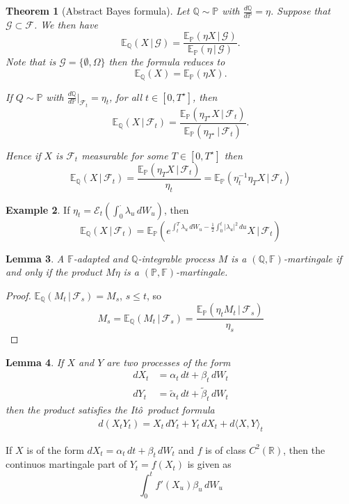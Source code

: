 \documentclass[10pt, oneside, reqno]{amsbook}
\theoremstyle{plain}%
\newtheorem{thm}{Theorem}[chapter]
\newtheorem{lem}[thm]{Lemma}
\theoremstyle{definition}
\newtheorem{exmp}[thm]{Example}
\theoremstyle{remark}
\newcommand{\given}{ \, | \,}
\newcommand{\sigf}{\mathcal{F}}
\newcommand{\Q}{\mathbb{Q}}
\newcommand{\R}{\mathbb{R}}
\newcommand{\E}{\mathbb{E}}
\renewcommand{\P}{\mathbb{P}}
\newcommand{\F}{\mathbb{F}}
\newcommand{\sigg}{\mathcal{G}}
\newcommand{\ito}{It\^o\ }
\newcommand{\doleans}[1]{\mathcal E_t \left(\int_0^\cdot #1 \right)}
\numberwithin{equation}{chapter}
\begin{document}
\begin{thm}[Abstract Bayes formula]
	Let $\Q \sim \P$ with $\frac{d \Q}{d \P} = \eta$.  Suppose that $\sigg \subset \sigf$.  We then have \[
		\E_\Q(X \given \sigg) = \frac{\E_\P(\eta X \given \sigg)}{\E_\P(\eta \given \sigg)}.
	\]  Note that is $\sigg = \{ \emptyset, \Omega \}$ then the formula reduces to \[
		\E_\Q(X) = \E_\P(\eta X).
	\]

	If $Q \sim \P$ with $\frac{d\Q}{d\P} |_{\sigf_t} = \eta_t$, for all $t \in [0, T^\star]$, then \[
		\E_\Q(X \given \sigf_t) = \frac{\E_\P(\eta_{T^\star} X \given \sigf_t)}{\E_\P(\eta_{T^\star} \given \sigf_t)}.
	\]
	
	Hence if $X$ is $\sigf_t$ measurable for some $T \in [0, T^\star]$ then \[
		\E_\Q(X \given \sigf_t) = \frac{\E_\P(\eta_T X \given \sigf_t)}{\eta_t} = \E_\P(\eta_t^{-1} \eta_T X \given \sigf_t)
	\]
\end{thm}

\begin{exmp}
	If $\eta_t = \doleans{\lambda_u \, dW_u}$, then \[
		\E_\Q(X \given \sigf_t) = \E_\P(e^{\int_t^T \lambda_u \, dW_u - \frac{1}{2} \int_0^t |\lambda_u|^2 \, du} X \given \sigf_t)
	\] 
\end{exmp}


\begin{lem}
	\label{lem:martingale_equivalence_measures}
	A $\F$-adapted and $\Q$-integrable process $M$ is a $(\Q, \F)$-martingale if and only if the product $M \eta$ is a $(\P, \F)$-martingale.
\end{lem}

\begin{proof}
	$\E_\Q(M_t \given \sigf_s) = M_s$, $s \leq t$, so \[
		M_s = \E_\Q(M_t \given \sigf_s) = \frac{\E_\P(\eta_t M_t \given \sigf_s)}{\eta_s}
	\]
\end{proof}

\begin{lem}
	If $X$ and $Y$ are two processes of the form \begin{align*}
		dX_t &= \alpha_t \, dt + \beta_t \, dW_t \\
		dY_t &= \tilde \alpha_t \, dt + \tilde \beta_t \, dW_t
	\end{align*} then the product satisfies the \ito product formula \begin{align*}
		d(X_t Y_t) = X_t \, dY_t + Y_t \, dX_t + d \langle X, Y \rangle_t
	\end{align*}	
\end{lem}

If $X$ is of the form $dX_t = \alpha_t \, dt + \beta_t \, dW_t$ and $f$ is of class $C^2(\R)$, then the continuos martingale part of $Y_t = f(X_t)$ is given as \[
	\int_0^t f'(X_u) \beta_u \, dW_u
\]
\end{document}

